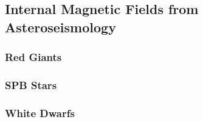 {\color{red}
\subsection{Internal Magnetic Fields from Asteroseismology}



\subsubsection{Red Giants}

\subsubsection{SPB Stars}

\subsubsection{White Dwarfs}



}
